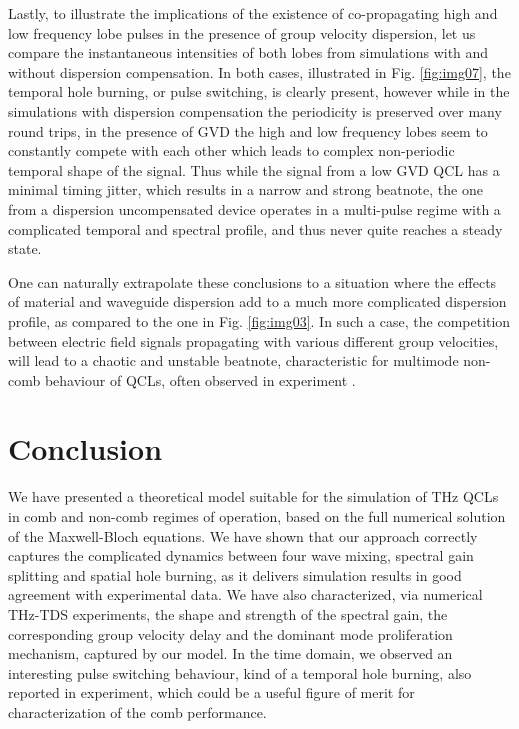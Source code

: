 \documentclass[twocolumn,secnumarabic,amssymb, nobibnotes, aps, prd]{revtex4-1}
\begin{document}
{			Lastly, to illustrate the implications of the existence of co-propagating high and low frequency lobe pulses in the presence of group velocity dispersion, let us compare the instantaneous intensities of both lobes from simulations with and without dispersion compensation. In both cases, illustrated in Fig. \ref{fig:img07}, the temporal hole burning, or pulse switching, is clearly present, however while in the simulations with dispersion compensation the periodicity is preserved over many round trips, in the presence of GVD the high and low frequency lobes seem to constantly compete with each other which leads to complex non-periodic temporal shape of the signal. Thus while the signal from a low GVD QCL has a minimal timing jitter, which results in a narrow and strong beatnote, the one from a dispersion uncompensated device operates in a multi-pulse regime with a complicated temporal and spectral profile, and thus never quite reaches a steady state.
			
			One can naturally extrapolate these conclusions to a situation where the effects of material and waveguide dispersion add to a much more complicated dispersion profile, as compared to the one in Fig. \ref{fig:img03}. In such a case, the competition between electric field signals propagating with various different group velocities, will lead to a chaotic and unstable beatnote, characteristic for multimode non-comb behaviour of QCLs, often observed in experiment \cite{wienold2014evidence,burghoff2014terahertz,rosch2015octave}.  
			
			\section{Conclusion}
			We have presented a theoretical model suitable for the simulation of THz QCLs in comb and non-comb regimes of operation, based on the full numerical solution of the Maxwell-Bloch equations. We have shown that our approach correctly captures the complicated dynamics between four wave mixing, spectral gain splitting and spatial hole burning, as it delivers simulation results in good agreement with experimental data. We have also characterized, via numerical THz-TDS experiments, the shape and strength of the spectral gain, the corresponding group velocity delay and the dominant mode proliferation mechanism, captured by our model. In the time domain, we observed an interesting pulse switching behaviour, kind of a temporal hole burning, also reported in experiment, which could be a useful figure of merit for characterization of the comb performance.     
			\newpage

}
\end{document}
